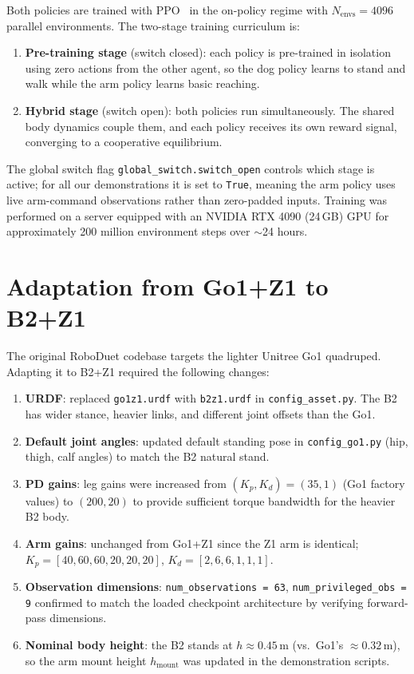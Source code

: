 Both policies are trained with PPO~\cite{schulman2017ppo} in the on-policy
regime with $N_\text{envs}=4096$ parallel environments.
The two-stage training curriculum is:
\begin{enumerate}
  \item \textbf{Pre-training stage} (switch closed): each policy is
        pre-trained in isolation using zero actions from the other agent,
        so the dog policy learns to stand and walk while the arm policy
        learns basic reaching.
  \item \textbf{Hybrid stage} (switch open): both policies run
        simultaneously.  The shared body dynamics couple them, and each
        policy receives its own reward signal, converging to a cooperative
        equilibrium.
\end{enumerate}
The global switch flag \texttt{global\_switch.switch\_open} controls which
stage is active; for all our demonstrations it is set to \texttt{True},
meaning the arm policy uses live arm-command observations rather than
zero-padded inputs.
Training was performed on a server equipped with an NVIDIA RTX 4090 (24\,GB)
GPU for approximately 200 million environment steps over $\sim$24 hours.

\section{Adaptation from Go1+Z1 to B2+Z1}
\label{sec:adaptation}

The original RoboDuet codebase targets the lighter Unitree Go1 quadruped.
Adapting it to B2+Z1 required the following changes:

\begin{enumerate}
  \item \textbf{URDF}: replaced \texttt{go1z1.urdf} with
        \texttt{b2z1.urdf} in \texttt{config\_asset.py}.  The B2 has wider
        stance, heavier links, and different joint offsets than the Go1.
  \item \textbf{Default joint angles}: updated default standing pose in
        \texttt{config\_go1.py} (hip, thigh, calf angles) to match the B2
        natural stand.
  \item \textbf{PD gains}: leg gains were increased from
        $(K_p, K_d) = (35, 1)$ (Go1 factory values) to $(200, 20)$ to
        provide sufficient torque bandwidth for the heavier B2 body.
  \item \textbf{Arm gains}: unchanged from Go1+Z1 since the Z1 arm is
        identical; $K_p = [40, 60, 60, 20, 20, 20]$,
        $K_d = [2, 6, 6, 1, 1, 1]$.
  \item \textbf{Observation dimensions}: \texttt{num\_observations = 63},
        \texttt{num\_privileged\_obs = 9} confirmed to match the loaded
        checkpoint architecture by verifying forward-pass dimensions.
  \item \textbf{Nominal body height}: the B2 stands at
        $h \approx 0.45$\,m (vs.~Go1's $\approx 0.32$\,m), so the arm mount
        height $h_\text{mount}$ was updated in the demonstration scripts.
\end{enumerate}

